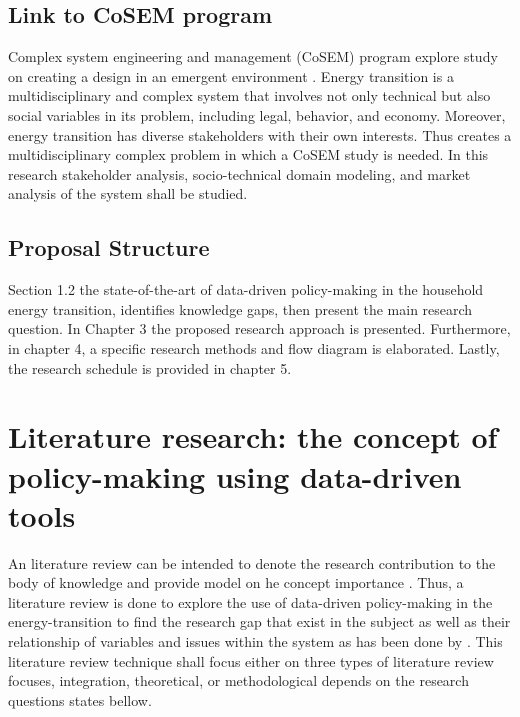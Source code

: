 
\subsection{Link to CoSEM program}
Complex system engineering and management (CoSEM) program explore study on creating a design in an emergent environment \citep{TPMStudentportal2019MScCoSEM}. Energy transition is a multidisciplinary and complex system that involves not only technical but also social variables in its problem, including legal, behavior, and economy. Moreover, energy transition has diverse stakeholders with their own interests. Thus creates a multidisciplinary complex problem in which a CoSEM study is needed. In this research stakeholder analysis, socio-technical domain modeling, and market analysis of the system shall be studied. 


\subsection{Proposal Structure}
Section 1.2 the state-of-the-art of data-driven policy-making in the household energy transition, identifies knowledge gaps, then present the main research question. In Chapter 3 the proposed research approach is presented. Furthermore, in chapter 4, a specific research methods and flow diagram is elaborated. Lastly, the research schedule is provided in chapter 5.

\section{Literature research: the concept of policy-making using data-driven tools}
An literature review can be intended to denote the research contribution to the body of knowledge \citep{Hart1998DoingPaperback, Marshall1989B.1999} and provide model on he concept importance \citep{Creswell1994ResearchApproach}. Thus, a literature review is done to explore the use of data-driven policy-making in the energy-transition to find the research gap that exist in the subject as well as their relationship of variables and issues within the system as has been done by \citep{Baumeister1997WritingReviews}. This literature review technique shall focus either on three types of literature review focuses, integration, theoretical, or methodological \citep{Cooper1988OrganizingReviews} depends on the research questions states bellow. 

